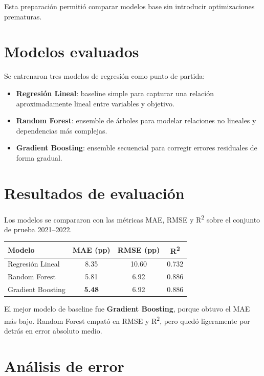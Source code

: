 \documentclass[12pt,a4paper]{article}
\begin{document}
Esta preparación permitió comparar modelos base sin introducir optimizaciones prematuras.

\section{Modelos evaluados}

Se entrenaron tres modelos de regresión como punto de partida:

\begin{itemize}
    \item \textbf{Regresión Lineal}: baseline simple para capturar una relación aproximadamente lineal entre variables y objetivo.
    \item \textbf{Random Forest}: ensemble de árboles para modelar relaciones no lineales y dependencias más complejas.
    \item \textbf{Gradient Boosting}: ensemble secuencial para corregir errores residuales de forma gradual.
\end{itemize}

\section{Resultados de evaluación}

Los modelos se compararon con las métricas MAE, RMSE y R\textsuperscript{2} sobre el conjunto de prueba 2021--2022.

\begin{center}
\begin{tabular}{lccc}
\hline
\textbf{Modelo} & \textbf{MAE (pp)} & \textbf{RMSE (pp)} & \textbf{R\textsuperscript{2}} \\
\hline
Regresi\'on Lineal & 8.35 & 10.60 & 0.732 \\
Random Forest & 5.81 & 6.92 & 0.886 \\
Gradient Boosting & \textbf{5.48} & 6.92 & 0.886 \\
\hline
\end{tabular}
\end{center}

El mejor modelo de baseline fue \textbf{Gradient Boosting}, porque obtuvo el MAE más bajo. Random Forest empató en RMSE y R\textsuperscript{2}, pero quedó ligeramente por detrás en error absoluto medio.

\section{Análisis de error}
\end{document}
